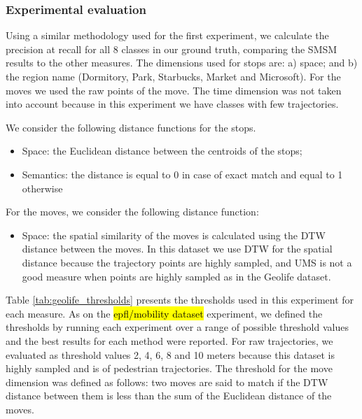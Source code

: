 \documentclass[12pt]{article}
\begin{document}
\subsubsection{Experimental evaluation}

Using a similar methodology used for the first experiment, we calculate the precision at recall for all 8 classes in our ground truth, comparing the SMSM results to the other measures. The dimensions used for stops are: a) space; and b) the region name (Dormitory, Park, Starbucks, Market and Microsoft). For the moves we used the raw points of the move. The time dimension was not taken into account because in this experiment we have classes with few trajectories.

We consider the following distance functions for the stops.
\begin{itemize}
  \item Space: the Euclidean distance between the centroids of the stops;
  \item Semantics: the distance is equal to 0 in case of exact match and equal to 1 otherwise
\end{itemize}

For the moves, we consider the following distance function:
\begin{itemize}
  \item Space: the spatial similarity of the moves is calculated using the DTW distance between the moves. In this dataset we use DTW for the spatial distance because the trajectory points are highly sampled, and UMS is not a good measure when points are highly sampled as in the Geolife dataset.
\end{itemize}

Table \ref{tab:geolife_thresholds} presents the thresholds used in this experiment for each measure. As on the \hl{epfl/mobility dataset} experiment, we defined the thresholds by running each experiment over a range of possible threshold values and the best results for each method were reported. For raw trajectories, we evaluated as threshold values 2, 4, 6, 8 and 10 meters because this dataset is highly sampled and is of pedestrian trajectories. The threshold for the move dimension was defined as follows: two moves are said to match if the DTW distance between them is less than the sum of the Euclidean distance of the moves.
\end{document}
